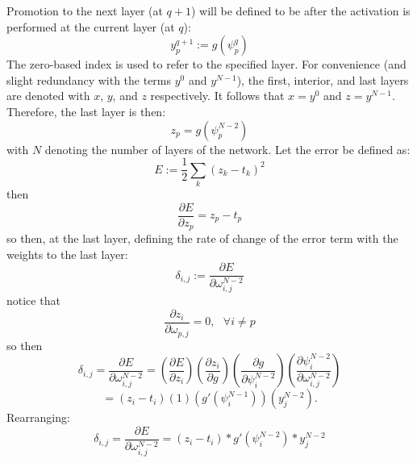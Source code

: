 \documentclass{article}
\begin{document}
Promotion to the next layer (at $q+1$) will be defined to be after the activation is performed at the current layer (at $q$):
%
\begin{equation} \label{eq:z}
y_p^{q+1} := g(\psi_p^q)
\end{equation}
%
The zero-based index is used to refer to the specified layer.
For convenience (and slight redundancy with the terms $y^0$ and $y^{N-1}$), the first, interior, and last layers are denoted with $x$, $y$, and $z$ respectively.
It follows that $x = y^0$ and $z = y^{N-1}$.
Therefore, the last layer is then:
%
\begin{equation} \label{eq:z}
z_p = g(\psi_p^{N-2})
\end{equation}
%
with $N$ denoting the number of layers of the network.
%
Let the error be defined as:
%
\begin{equation} \label{eq:error}
E := \frac{1}{2} \sum_k (z_k - t_k)^2
\end{equation}
%
then
%
\begin{equation} \label{eq:derror}
\frac{\partial E}{\partial z_p} = z_p - t_p
\end{equation}
%
so then, at the last layer, defining the rate of change of the error term with the weights to the last layer:
%
\begin{equation} \label{eq:delta}
\delta_{i,j} := \frac{\partial E}{\partial \omega_{i,j}^{N-2}}
\end{equation}
%
notice that
%
\begin{equation} \label{eq:last_layer_derror_eq_0}
\frac{\partial z_i}{\partial \omega_{p,j}} = 0, \ \ \ \forall i \neq p
\end{equation}
%
so then
%
\begin{equation} \label{eq:last_layer_derror}
\delta_{i,j} =
\frac{\partial E}{\partial \omega_{i,j}^{N-2}} =
\left( \frac{\partial E}{\partial z_i} \right)
\left( \frac{\partial z_i}{\partial g} \right)
\left( \frac{\partial g}{\partial \psi_i^{N-2}} \right)
\left( \frac{\partial \psi_i^{N-2}}{\partial \omega_{i, j}^{N-2}} \right)
\end{equation}
%
\begin{equation} \label{eq:last_layer_derror3}
=
\left( z_i - t_i \right)
\left( 1 \right)
\left( g' (\psi_i^{N-1}) \right)
\left( y_j^{N-2} \right).
\end{equation}
%
Rearranging:
\begin{equation} \label{eq:delta_full}
\delta_{i,j} = 
\frac{\partial E}{\partial \omega_{i,j}^{N-2}} =
\left ( z_i - t_i \right ) *
g' (\psi_i^{N-2}) *
y_j^{N-2}
\end{equation}
\end{document}
